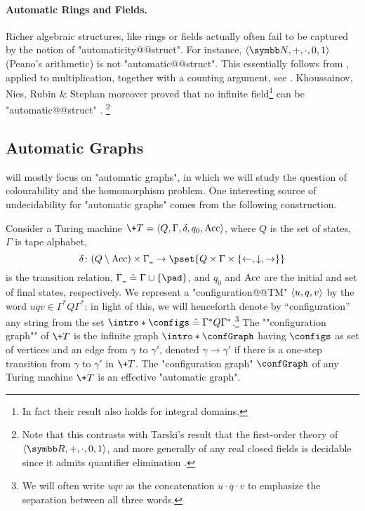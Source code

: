 \paragraph*{Automatic Rings and Fields.}
Richer algebraic structures, like rings or fields actually often fail to be captured by
the notion of "automaticity@@struct". For instance, $\tup{\N,{+},{\cdot},0,1}$ (Peano's arithmetic)
is not "automatic@@struct".
This essentially follows from , applied to multiplication,
together with a counting argument, see \cite[Corollary~XII.8.11]{Blumensath2024MSOModelTheory}.
Khoussainov, Nies, Rubin \& Stephan moreover proved that no infinite field\footnote{In fact their result also holds for integral domains.} can be "automatic@@struct"
\cite[Theorem~3.10 \& Corollary~3.11]{JainKhoussainovSchlichtStephan2019IsomorphismTreeAutomaticOrdinals}.%
\footnote{Note that this contrasts with Tarski's result that the first-order theory
of $\tup{\R,+,\cdot,0,1}$, and more generally of any real closed fields is 
decidable since it admits quantifier elimination \cite[Theorem~8.4.4]{Hodges1993ModelTheory}.}


\subsection{Automatic Graphs}
 will mostly focus on "automatic graphs", in which we will study
the question of colourability and the homomorphism problem.
One interesting source of undecidability for "automatic graphs" comes from the following construction.

\begin{example}
	Consider a Turing machine $\+T = \tup{Q,\Gamma,\delta,q_0,\Acc}$, where $Q$ is the set of states, $\Gamma$ is tape alphabet,
	\[
		\delta\colon (Q \setminus \Acc) \times \Gamma_{\smallpad} \to \pset{Q \times \Gamma \times \set{\leftarrow, \downarrow, \rightarrow}}
	\]
	is the transition relation, $\Gamma_{\smallpad} \defeq \Gamma \dcup \set{\pad}$, and $q_0$ and $\textrm{Acc}$ are the initial and set of final states, respectively.
	We represent a "configuration@@TM" $\langle u, q, v\rangle$ by the word $uqv \in \Gamma^* Q \Gamma^*$:
	in light of this, we will henceforth denote by ``configuration'' any string from the set  \AP$\intro*\configs \defeq  \Gamma^* Q \Gamma^*$.\footnote{We will often write
	$uqv$ as the concatenation $u\cdot q \cdot v$ to emphasize
	the separation between all three words.}
	The \AP""configuration graph"" of $\+T$ is the infinite graph $\intro*\confGraph$ having $\configs$ as set of vertices and an edge from $\gamma$ to $\gamma'$, denoted $\gamma \rightarrow \gamma'$ if there is a one-step transition from $\gamma$ to $\gamma'$ in $\+T$. The "configuration graph" $\confGraph$ of any Turing machine $\+T$ is an effective "automatic graph".
\end{example}

